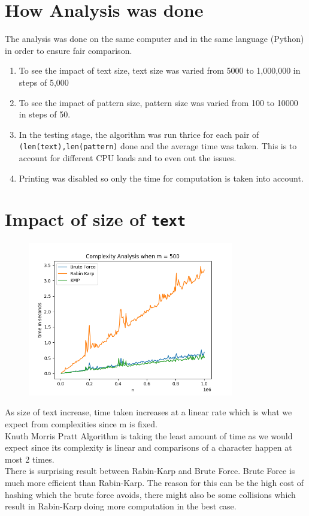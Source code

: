 \documentclass[a4paper, 12pt]{report}
\begin{document}
    \section{How Analysis was done}
    The analysis was done on the same computer and in the same language (Python) in order to ensure fair comparison.
    \begin{enumerate}
        \item To see the impact of text size, text size was varied from 5000 to 1,000,000 in steps of 5,000
        \item To see the impact of pattern size, pattern size was varied from 100 to 10000 in steps of 50.
        \item In the testing stage, the algorithm was run thrice for each pair of \texttt{(len(text),len(pattern)} done and the average time was taken. This is to account for different CPU loads and to even out the issues.
        \item Printing was disabled so only the time for computation is taken into account.
    \end{enumerate}
    \newpage

    \section{Impact of size of \texttt{text}}
    \begin{figure}[H]
        \centering
        \includegraphics[width=0.8\textwidth]{n_analysis.png}
    \end{figure}
    As size of text increase, time taken increases at a linear rate which is what we expect from complexities since m is fixed. \\
Knuth Morris Pratt Algorithm is taking the least amount of time as we would expect since its complexity is linear and comparisons of a character happen at most 2 times. \\
There is surprising result between Rabin-Karp and Brute Force. Brute Force is much more efficient than Rabin-Karp. The reason for this can be the high cost of hashing which the brute force avoids, there might also be some collisions which result in Rabin-Karp doing more computation in the best case. 
\end{document}
